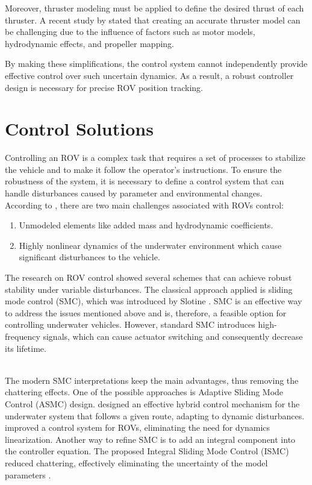     Moreover, thruster modeling must be applied to define the desired thrust of each thruster. A recent
    study by \cite{bluerov} stated that creating an accurate thruster model can be challenging due to the
    influence of factors such as motor models, hydrodynamic effects, and propeller mapping.
    
    By making these simplifications, the control system cannot independently provide effective control
    over such uncertain dynamics. As a result, a robust controller design is necessary for precise ROV
    position tracking.

\section{Control Solutions}

    Controlling an ROV is a complex task that requires a set of processes to stabilize the vehicle and
    to make it follow the operator's instructions. To ensure the robustness of the system, it is
    necessary to define a control system that can handle disturbances caused by parameter and
    environmental changes. \\
    According to \cite{overview}, there are two main challenges associated with ROVs control:
    \begin{enumerate}
        \item Unmodeled elements like added mass and hydrodynamic coefficients.
        \item Highly nonlinear dynamics of the underwater environment which cause significant disturbances to the vehicle.
    \end{enumerate}

    The research on ROV control showed several schemes that can achieve robust stability under
    variable disturbances. The classical approach applied is sliding mode control (SMC), which was
    introduced by Slotine \cite{slotine}. SMC is an effective way to address the issues mentioned above and is,
    therefore, a feasible option for controlling underwater vehicles. However,
    standard SMC introduces high-frequency signals, which can cause actuator switching and consequently
    decrease its lifetime.

    \\
    The modern SMC interpretations keep the main advantages,
    thus removing the chattering effects. One of the possible approaches is Adaptive Sliding Mode Control
    (ASMC) design. \cite{fossen:control} designed an effective hybrid control mechanism for the underwater system that
    follows a given route, adapting to dynamic disturbances. \cite{adaptive_smc} improved a control system for ROVs,
    eliminating the need for dynamics linearization. Another way to refine SMC is to add an integral
    component into the controller equation. The proposed Integral Sliding Mode Control (ISMC) reduced
    chattering, effectively eliminating the uncertainty of the model parameters \cite{integral_smc}.

